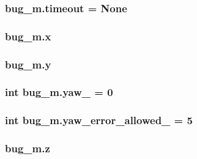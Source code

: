 \subsubsection[{\texorpdfstring{timeout}{timeout}}]{\setlength{\rightskip}{0pt plus 5cm}bug\+\_\+m.\+timeout = None}\hypertarget{namespacebug__m_ad56f445349e05abe7f111b48e25d3ecb}{}\label{namespacebug__m_ad56f445349e05abe7f111b48e25d3ecb}
\subsubsection[{\texorpdfstring{x}{x}}]{\setlength{\rightskip}{0pt plus 5cm}bug\+\_\+m.\+x}\hypertarget{namespacebug__m_af10f89c7f929c9babce108f5d7382996}{}\label{namespacebug__m_af10f89c7f929c9babce108f5d7382996}
\subsubsection[{\texorpdfstring{y}{y}}]{\setlength{\rightskip}{0pt plus 5cm}bug\+\_\+m.\+y}\hypertarget{namespacebug__m_ab8596d2ae799585b0d89152b55891aa8}{}\label{namespacebug__m_ab8596d2ae799585b0d89152b55891aa8}
\subsubsection[{\texorpdfstring{yaw\+\_\+}{yaw_}}]{\setlength{\rightskip}{0pt plus 5cm}int bug\+\_\+m.\+yaw\+\_\+ = 0}\hypertarget{namespacebug__m_a8b5b5c9259592b8efd526c5adb95d95b}{}\label{namespacebug__m_a8b5b5c9259592b8efd526c5adb95d95b}
\subsubsection[{\texorpdfstring{yaw\+\_\+error\+\_\+allowed\+\_\+}{yaw_error_allowed_}}]{\setlength{\rightskip}{0pt plus 5cm}int bug\+\_\+m.\+yaw\+\_\+error\+\_\+allowed\+\_\+ = 5}\hypertarget{namespacebug__m_a23e5e76f14d9d0d139767cb229a53dda}{}\label{namespacebug__m_a23e5e76f14d9d0d139767cb229a53dda}
\subsubsection[{\texorpdfstring{z}{z}}]{\setlength{\rightskip}{0pt plus 5cm}bug\+\_\+m.\+z}\hypertarget{namespacebug__m_afbb54887da57b97920c8d36c6daed1fc}{}\label{namespacebug__m_afbb54887da57b97920c8d36c6daed1fc}
